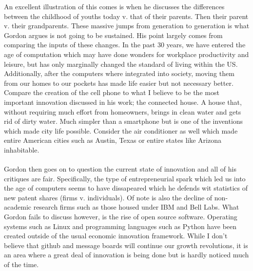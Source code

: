An excellent illustration of this comes is when he discusses the differences between the childhood of youths today v. that of their parents. Then their parent v. their grandparents. These massive jumps from generation to generation is what Gordon argues is not going to be sustained. His point largely comes from comparing the inputs of these changes. In the past 30 years, we have entered the age of computation which may have done wonders for workplace productivity and leisure, but has only marginally changed the standard of living within the US. Additionally, after the computers where integrated into society, moving them from our homes to our pockets has made life easier but not necessary better. Compare the creation of the cell phone to what I believe to be the most important innovation discussed in his work; the connected house. A house that, without requiring much effort from homeowners, brings in clean water and gets rid of dirty water. Much simpler than a smartphone but is one of the inventions which made city life possible. Consider the air conditioner as well which made entire American cities such as Austin, Texas or entire states like Arizona inhabitable.\\
\\
Gordon then goes on to question the current state of innovation and all of his critiques are fair. Specifically, the type of entrepreneurial spark which led us into the age of computers seems to have dissapeared which he defends wit statistics of new patent shares (firms v. individuals). Of note is also the decline of non-academic research firms such as those housed under IBM and Bell Labs. What Gordon fails to discuss however, is the rise of open source software. Operating systems such as Linux and programming languages such as Python have been created outside of the usual economic innovation framework. While I don't believe that github and message boards will continue our growth revolutions, it is an area where a great deal of innovation is being done but is hardly noticed much of the time. 


